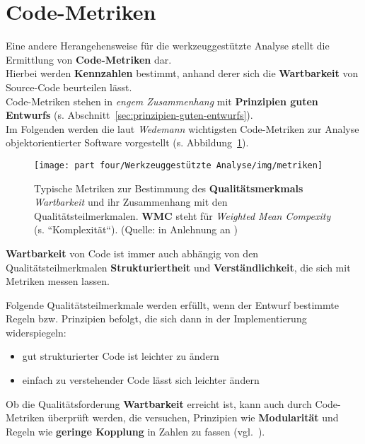 \section{Code-Metriken}
Eine andere Herangehensweise für die werkzeuggestützte Analyse stellt die Ermittlung von \textbf{Code-Metriken} dar.\\
Hierbei werden \textbf{Kennzahlen} bestimmt, anhand derer sich die \textbf{Wartbarkeit} von Source-Code beurteilen lässt.\\
Code-Metriken stehen in \textit{engem Zusammenhang} mit \textbf{Prinzipien guten Entwurfs} (s. Abschnitt~\ref{sec:prinzipien-guten-entwurfs}).\\
Im Folgenden werden die laut \textit{Wedemann} wichtigsten Code-Metriken zur Analyse objektorientierter Software vorgestellt (s. Abbildung~\ref{fig:metriken}).

\begin{figure}
    \centering
    \texttt{[image: part four/Werkzeuggestützte Analyse/img/metriken]}
    \caption{Typische Metriken zur Bestimmung des \textbf{Qualitätsmerkmals} \textit{Wartbarkeit} und ihr Zusammenhang mit den Qualitätsteilmerkmalen. \textbf{WMC} steht für  \textit{Weighted Mean Compexity} (s. ``Komplexität``). (Quelle: in Anlehnung an \cite[Abb. 4.3, 37]{Wed09c})}
    \label{fig:metriken}
\end{figure}

\begin{tcolorbox}[colback=white]
    \textbf{Wartbarkeit} von Code ist immer auch abhängig von den Qualitätsteilmerkmalen \textbf{Strukturiertheit} und \textbf{Verständlichkeit}, die sich mit Metriken messen lassen.\\
\end{tcolorbox}
\vspace{2mm}

\noindent
Folgende Qualitätsteilmerkmale werden erfüllt, wenn der Entwurf bestimmte Regeln bzw. Prinzipien befolgt, die sich dann in der Implementierung widerspiegeln:

\begin{itemize}
    \item gut strukturierter Code ist leichter zu ändern
    \item einfach zu verstehender Code lässt sich leichter ändern
\end{itemize}

\begin{tcolorbox}
    Ob die Qualitätsforderung \textbf{Wartbarkeit} erreicht ist, kann auch durch Code-Metriken überprüft werden, die versuchen, Prinzipien wie \textbf{Modularität} und Regeln wie \textbf{geringe Kopplung} in Zahlen zu fassen (vgl.~\cite[38]{Wed09c}).
\end{tcolorbox}
\vspace{2mm}


